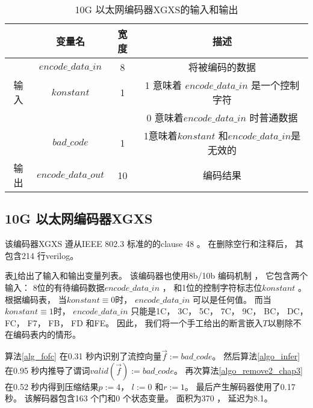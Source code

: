 \begin{table}[t]%
\caption{10G 以太网编码器XGXS的输入和输出}
\label{tab:eth10g}
\centering
\begin{tabular}{|c|c|c|c|}
\hline
         & 变量名               & 宽度  & 描述\\\hline\hline
         & $encode\_data\_in$   & 8     &将被编码的数据 \\\cline{2-4}
输入     & $konstant$           & 1     &1 意味着 $encode\_data\_in$ 是一个控制字符\\
         &                      &       &0 意味着$encode\_data\_in$ 时普通数据\\\cline{2-4}
         & $bad\_code$          & 1     &1意味着$konstant$ 和$encode\_data\_in$是无效的\\\hline
输出     & $encode\_data\_out$  & 10    &编码结果\\\hline
\end{tabular}
\end{table}%

\subsection{10G 以太网编码器XGXS}\label{subsec_10g}
该编码器XGXS 遵从IEEE 802.3 标准的的clause 48 。
在删除空行和注释后，
其包含214 行verilog。

表\ref{tab:eth10g}给出了输入和输出变量列表。
该编码器也使用8b/10b 编码机制 ，
它包含两个输入：
8位的有待编码数据$encode\_data\_in$ ，
和1位的控制字符标志位$konstant$ 。
根据编码表，
当$konstant\equiv 0$时，
$encode\_data\_in$ 可以是任何值。
而当$konstant\equiv 1$时，
$encode\_data\_in$ 只能是1C， 3C， 5C， 7C， 9C， BC， DC， FC， F7， FB， FD 和FE。
因此，
我们将一个手工给出的断言嵌入$T$以剔除不在编码表内的情形。

算法\ref{alg_fofc} 在0.31 秒内识别了流控向量$\vec{f}:=bad\_code$。
然后算法\ref{algo_infer}
在0.95 秒内推导了谓词$valid(\vec{f}):=\!bad\_code$。
再次算法\ref{algo_remove2_chap3} 在0.52 秒内得到压缩结果$p:=4$， $l:=0$ 和$r:=1$。
最后产生解码器使用了0.17 秒。
该解码器包含163 个门和0 个状态变量。
面积为370 ，
延迟为8.1。

